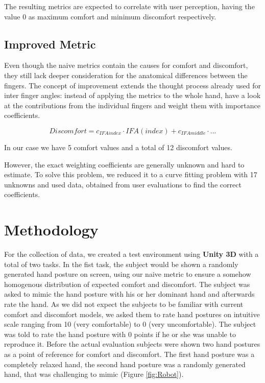\documentclass{sig-alternate-05-2015}
\begin{document}
The resulting metrics are expected to correlate with user perception, having the value 0 as maximum comfort and minimum discomfort respectively.


\subsection{Improved Metric}

Even though the naive metrics contain the causes for comfort and discomfort, they still lack deeper consideration for the anatomical differences between the fingers.
The concept of improvement extends the thought process already used for inter finger angles: instead of applying the metrics to the whole hand, have a look at the contributions from the individual fingers and weight them with importance coefficients. 

	\[
	Discomfort = c_{IFAindex}\cdot IFA(index)  +  c_{IFAmiddle}\cdot...
	\]

In our case we have 5 comfort values and a total of 12 discomfort values. 

However, the exact weighting coefficients are generally unknown and hard to estimate. To solve this problem, we reduced it to a curve fitting problem with 17 unknowns and used data, obtained from user evaluations to find the correct coefficients.

\section{Methodology}

For the collection of data, we created a test environment using \textbf{Unity 3D} with a total of two tasks. In the fist task, the subject would be shown a randomly generated hand posture on screen, using our naive metric to ensure a somehow homogenous distribution of expected comfort and discomfort. The subject was asked to mimic the hand posture with his or her dominant hand and afterwards rate the hand. As we did not expect the subjects to be familiar with current comfort and discomfort models, we asked them to rate hand postures on intuitive scale ranging from 10 (very comfortable) to 0 (very uncomfortable). The subject was told to rate the hand posture with 0 points if he or she was unable to reproduce it. Before the actual evaluation subjects were shown two hand postures as a point of reference for comfort and discomfort. The first hand posture was a completely relaxed hand, the second hand posture was a randomly generated hand, that was challenging to mimic (Figure \ref{fig:Robot}).
\end{document}
